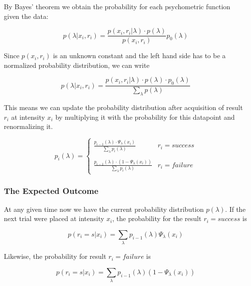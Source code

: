 \documentclass[10pt,letterpaper]{article}
\begin{document}
By Bayes' theorem we obtain the probability for each psychometric function given the data:

\begin{equation}
p(\lambda |x_i,r_i) = \frac{ p(x_i,r_i|\lambda) \cdot p(\lambda) }{p(x_i,r_i)} p_0(\lambda)
\end{equation}

Since $p(x_i,r_i)$ is an unknown constant and the left hand side has to be a 
normalized probability distribution, we can write

\begin{equation}
p(\lambda |x_i,r_i) = \frac{ p(x_i,r_i|\lambda) \cdot p(\lambda) \cdot p_0(\lambda)}{\sum_\lambda p(\lambda)} 
\end{equation}

This means we can update the probability distribution after acquisition of 
result $r_i$ at intensity $x_i$ by multiplying it with the probability for this 
datapoint and renormalizing it.

\begin{equation}
p_i(\lambda) = \left\{ \begin{array}{ll}
  \frac{\displaystyle p_{i-1}(\lambda) \cdot \Psi_\lambda(x_i)}{\displaystyle \sum_\lambda p_i(\lambda)} & r_i = success \\
  \\
  \frac{\displaystyle p_{i-1}(\lambda) \cdot (1 - \Psi_\lambda(x_i))}{\displaystyle \sum_\lambda p_i(\lambda)} & r_i = failure \end{array} \right.
\label{eq:pd}
\end{equation}

\subsubsection{The Expected Outcome}

At any given time now we have the current probability distribution $p(\lambda)$. 
If the next trial were placed at intensity $x_i$, the probability for the result $r_i=success$
is

\begin{equation}
p(r_i=s|x_i) = \sum_\lambda p_{i-1}(\lambda) \Psi_\lambda(x_i)
\label{eq:p1}
\end{equation}

Likewise, the probability for result $r_i=failure$ is 

\begin{equation}
p(r_i=s|x_i) = \sum_\lambda p_{i-1}(\lambda) (1-\Psi_\lambda(x_i))
\label{eq:p2}
\end{equation}
\end{document}
